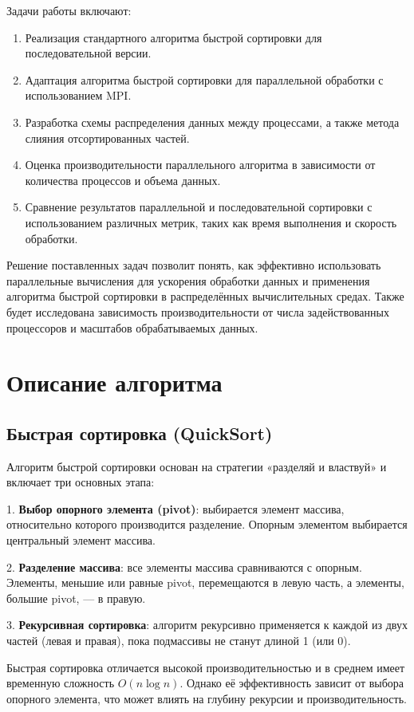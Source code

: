 \documentclass[12pt]{article}
\begin{document}
Задачи работы включают:
\begin{enumerate}
    \item Реализация стандартного алгоритма быстрой сортировки для последовательной версии.
    \item Адаптация алгоритма быстрой сортировки для параллельной обработки с использованием MPI.
    \item Разработка схемы распределения данных между процессами, а также метода слияния отсортированных частей.
    \item Оценка производительности параллельного алгоритма в зависимости от количества процессов и объема данных.
    \item Сравнение результатов параллельной и последовательной сортировки с использованием различных метрик, таких как время выполнения и скорость обработки.
\end{enumerate}

Решение поставленных задач позволит понять, как эффективно использовать параллельные вычисления для ускорения обработки данных и применения алгоритма быстрой сортировки в распределённых вычислительных средах. Также будет исследована зависимость производительности от числа задействованных процессоров и масштабов обрабатываемых данных.

\newpage
\section{Описание алгоритма}

\subsection{Быстрая сортировка (QuickSort)}

Алгоритм быстрой сортировки основан на стратегии «разделяй и властвуй» и включает три основных этапа:

1. \textbf{Выбор опорного элемента (pivot)}: выбирается элемент массива, относительно которого производится разделение. Опорным элементом выбирается центральный элемент массива.

2. \textbf{Разделение массива}: все элементы массива сравниваются с опорным. Элементы, меньшие или равные pivot, перемещаются в левую часть, а элементы, большие pivot, — в правую.

3. \textbf{Рекурсивная сортировка}: алгоритм рекурсивно применяется к каждой из двух частей (левая и правая), пока подмассивы не станут длиной 1 (или 0).

Быстрая сортировка отличается высокой производительностью и в среднем имеет временную сложность $O(n \log n)$. Однако её эффективность зависит от выбора опорного элемента, что может влиять на глубину рекурсии и производительность.
\end{document}
